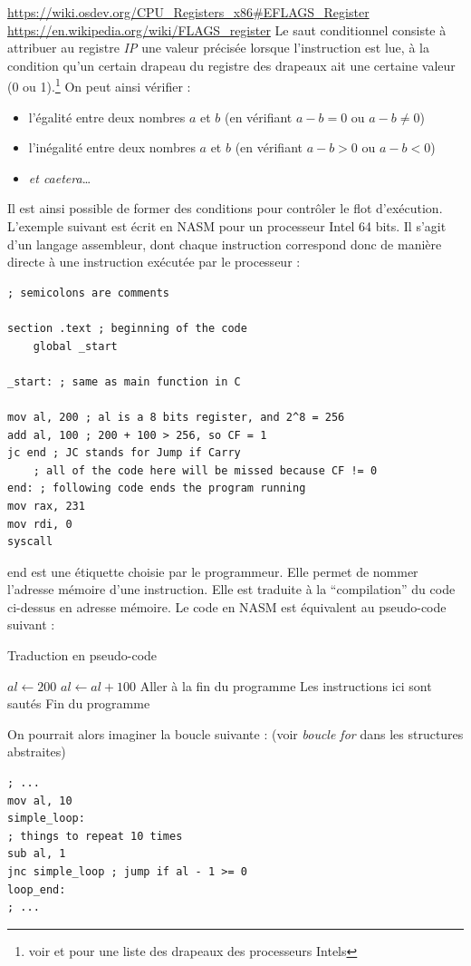\documentclass[../../../main.tex]{subfiles}
\begin{document}
\urldef{\urlrflagsa}\url{https://wiki.osdev.org/CPU_Registers_x86#EFLAGS_Register}
\urldef{\urlrflagsb}\url{https://en.wikipedia.org/wiki/FLAGS_register}
Le saut conditionnel consiste à attribuer au registre \textit{IP} une valeur précisée lorsque l'instruction est lue, à la condition qu'un certain drapeau du registre des drapeaux ait une certaine valeur (0 ou 1).\footnote{voir \urlrflagsa et \urlrflagsb pour une liste des drapeaux des processeurs Intels} On peut ainsi vérifier :
\begin{itemize}
	\item l'égalité entre deux nombres $a$ et $b$ (en vérifiant $a - b = 0$ ou $a - b \neq{0}$)
	\item l'inégalité entre deux nombres $a$ et $b$ (en vérifiant $a - b > 0$ ou $a - b < 0$)
	\item \textit{et caetera}\dots
\end{itemize}
Il est ainsi possible de former des conditions pour contrôler le flot d'exécution. L'exemple suivant est écrit en NASM pour un processeur Intel 64 bits. Il s'agit d'un langage assembleur, dont chaque instruction correspond donc de manière directe à une instruction exécutée par le processeur :
\begin{verbatim}
; semicolons are comments

section .text ; beginning of the code
	global _start

_start: ; same as main function in C

mov al, 200 ; al is a 8 bits register, and 2^8 = 256
add al, 100 ; 200 + 100 > 256, so CF = 1
jc end ; JC stands for Jump if Carry
	; all of the code here will be missed because CF != 0
end: ; following code ends the program running
mov rax, 231
mov rdi, 0
syscall
\end{verbatim}
\textsf{end} est une étiquette choisie par le programmeur. Elle permet de nommer l'adresse mémoire d'une instruction. Elle est traduite à la ``compilation'' du code ci-dessus en adresse mémoire. Le code en NASM est équivalent au pseudo-code suivant :
\begin{algorithm}
\caption{Traduction en pseudo-code}\label{alg:two}
$al\leftarrow 200$\;
$al\leftarrow al + 100$\;
 {
	Aller à la fin du programme\;
} {
	Les instructions ici sont sautés
}
Fin du programme\;
\end{algorithm}\newline
On pourrait alors imaginer la boucle suivante : (voir \textit{boucle for} dans les structures abstraites)
\begin{verbatim}
; ...
mov al, 10
simple_loop:
; things to repeat 10 times
sub al, 1
jnc simple_loop ; jump if al - 1 >= 0
loop_end:
; ...
\end{verbatim}
\end{document}
